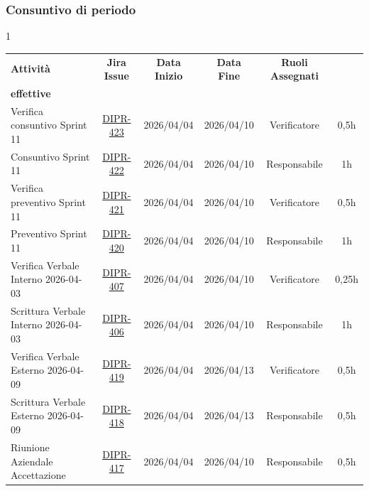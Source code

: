\documentclass[a4paper,12pt]{article}
\begin{document}
\subsubsection{Consuntivo di periodo}
\begin{spacing}{1}
    \small
\begin{longtable}{|p{4cm}|c|c|c|c|c|}
        \hline
        \rowcolor{zpusgreen!30}
        \textbf{Attività} & \textbf{Jira Issue} & \textbf{Data Inizio} & \textbf{Data Fine} & \textbf{Ruoli Assegnati} & \begin{tabular}[c]{@{}c@{}} \textbf{Ore} \\ \textbf{effettive} \end{tabular} \\
        \hline
        Verifica consuntivo Sprint 11 & \href{https://7zpus.atlassian.net/browse/DIPR-423}{DIPR-423} & 2026/04/04 & 2026/04/10 & Verificatore & 0,5h \\
        \hline
        Consuntivo Sprint 11 & \href{https://7zpus.atlassian.net/browse/DIPR-422}{DIPR-422} & 2026/04/04 & 2026/04/10 & Responsabile & 1h \\
        \hline
        Verifica preventivo Sprint 11 & \href{https://7zpus.atlassian.net/browse/DIPR-421}{DIPR-421} & 2026/04/04 & 2026/04/10 & Verificatore & 0,5h \\
        \hline
        Preventivo Sprint 11 & \href{https://7zpus.atlassian.net/browse/DIPR-420}{DIPR-420} & 2026/04/04 & 2026/04/10 & Responsabile & 1h \\
        \hline
        Verifica Verbale Interno 2026-04-03 & \href{https://7zpus.atlassian.net/browse/DIPR-407}{DIPR-407} & 2026/04/04 & 2026/04/10 & Verificatore & 0,25h \\
        \hline
        Scrittura Verbale Interno 2026-04-03 & \href{https://7zpus.atlassian.net/browse/DIPR-406}{DIPR-406} & 2026/04/04 & 2026/04/10 & Responsabile & 1h \\
        \hline
        Verifica Verbale Esterno 2026-04-09 & \href{https://7zpus.atlassian.net/browse/DIPR-419}{DIPR-419} & 2026/04/04 & 2026/04/13 & Verificatore & 0,5h \\
        \hline
        Scrittura Verbale Esterno 2026-04-09 & \href{https://7zpus.atlassian.net/browse/DIPR-418}{DIPR-418} & 2026/04/04 & 2026/04/13 & Responsabile & 0,5h \\
        \hline
        Riunione Aziendale Accettazione & \href{https://7zpus.atlassian.net/browse/DIPR-417}{DIPR-417} & 2026/04/04 & 2026/04/10 & Responsabile & 0,5h \\

\end{longtable}
\end{spacing}
\end{document}
